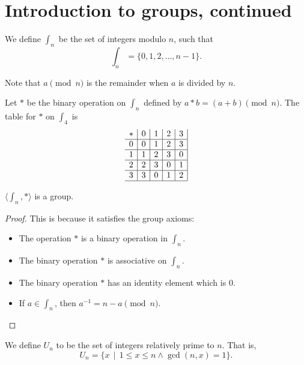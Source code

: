 
\section{Introduction to groups, continued}
    \begin{dfn}
        We define \(\int_n\) be the set of integers modulo \(n\), such that \[\int_n = \{0, 1, 2, \ldots, n - 1\}.\] 

        Note that \(a \pmod{n}\) is the remainder when \(a\) is divided by \(n\).
    \end{dfn}

    \begin{example}
        Let \(*\) be the binary operation on \(\int_n\) defined by \(a * b = (a + b)\pmod{n}\). The table for \(*\) on \(\int_4\) is
        \[
            \begin{array}{c|c|c|c|c|}
                * & 0 & 1 & 2 & 3 \\ \hline
                0 & 0 & 1 & 2 & 3 \\ \hline
                1 & 1 & 2 & 3 & 0 \\ \hline
                2 & 2 & 3 & 0 & 1 \\ \hline
                3 & 3 & 0 & 1 & 2 \\ \hline
            \end{array}
        \]
    \end{example}

    \begin{thm}
        \(\langle \int_n, * \rangle\) is a group.
    \end{thm}

    \begin{proof}
        This is because it satisfies the group axioms:
        \begin{itemize}
            \item The operation \(*\) is a binary operation in \(\int_n\).
            \item The binary operation \(*\) is associative on \(\int_n\).
            \item The binary operation \(*\) has an identity element which is \(0\).
            \item If \(a\in\int_n\), then \(a^{-1} = n - a \pmod{n}\).
        \end{itemize}
    \end{proof}

    \begin{dfn}
        We define \(U_n\) to be the set of integers relatively prime to \(n\). That is, \[U_n = \{x \,\mid\, 1 \leq x \leq n \land \gcd(n, x) = 1\}.\]
    \end{dfn}


